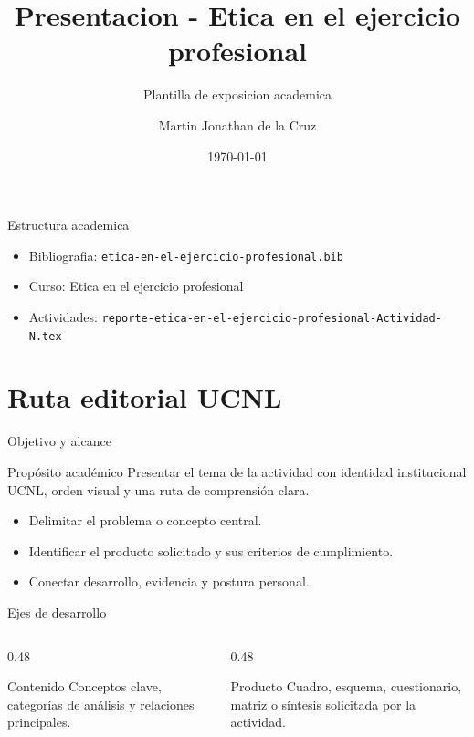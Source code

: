 ﻿\documentclass[spanish,aspectratio=169]{beamer}
\title{Presentacion - Etica en el ejercicio profesional}
\subtitle{Plantilla de exposicion academica}
\author{Martin Jonathan de la Cruz}
\institute{Universidad Ciudadana de Nuevo Leon}
\date{\today}
\begin{document}
\begin{frame}
  \titlepage
\end{frame}

\begin{frame}{Estructura academica}
  \begin{itemize}
    \item Bibliografia: \texttt{etica-en-el-ejercicio-profesional.bib}
    \item Curso: Etica en el ejercicio profesional
    \item Actividades: \texttt{reporte-etica-en-el-ejercicio-profesional-Actividad-N.tex}
  \end{itemize}
\end{frame}


\section{Ruta editorial UCNL}

\begin{frame}{Objetivo y alcance}
  \begin{block}{Propósito académico}
    Presentar el tema de la actividad con identidad institucional UCNL, orden visual y una ruta de comprensión clara.
  \end{block}
  \begin{itemize}
    \item Delimitar el problema o concepto central.
    \item Identificar el producto solicitado y sus criterios de cumplimiento.
    \item Conectar desarrollo, evidencia y postura personal.
  \end{itemize}
\end{frame}

\begin{frame}{Ejes de desarrollo}
  \begin{columns}[T,totalwidth=\textwidth]
    \begin{column}{0.48\textwidth}
      \begin{block}{Contenido}
        Conceptos clave, categorías de análisis y relaciones principales.
      \end{block}
    \end{column}
    \begin{column}{0.48\textwidth}
      \begin{block}{Producto}
        Cuadro, esquema, cuestionario, matriz o síntesis solicitada por la actividad.
      \end{block}
    \end{column}
  \end{columns}
\end{frame}
\end{document}
